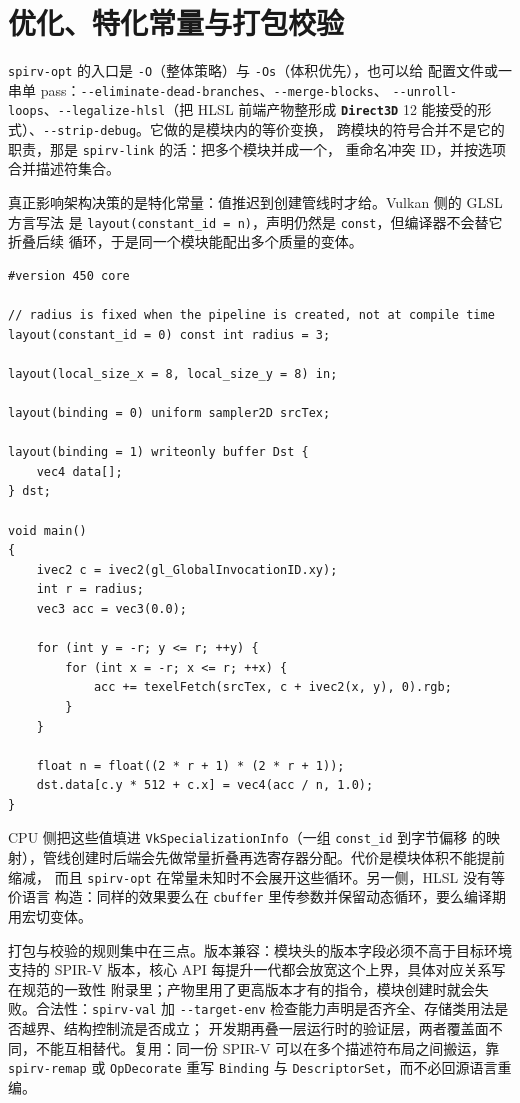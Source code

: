 \documentclass[12pt,a4paper,fontset=fandol]{ctexbook}
\newcommand{\Tp}[1]{\texttt{#1}}
\newcommand{\Opt}[1]{\texttt{-\/-#1}}
\newcommand{\Bk}{\discretionary{}{}{}}
\newcommand{\Lib}[1]{\textbf{\texttt{#1}}}
\newcommand{\Lang}[1]{\textsf{#1}}
\newcommand{\DomCPU}{\Lang{CPU}}
\newcommand{\GSL}{\Lang{GLSL}}
\newcommand{\HSL}{\Lang{HLSL}}
\newcommand{\SPIV}{\Lang{SPIR-V}}
\begin{document}
\section{优化、特化常量与打包校验}

\Tp{spirv\Bk-opt} 的入口是 \Tp{-O}（整体策略）与 \Tp{-Os}（体积优先），也可以给
配置文件或一串单 pass：\Tp{-\/-eliminate-dead-branches}、\Tp{-\/-merge-blocks}、
\Tp{-\/-unroll-loops}、\Tp{-\/-legalize-hlsl}（把 \HSL{} 前端产物整形成
\Lib{Direct3D} 12 能接受的形式）、\Tp{-\/-strip-debug}。它做的是模块内的等价变换，
跨模块的符号合并不是它的职责，那是 \Tp{spirv\Bk-link} 的活：把多个模块并成一个，
重命名冲突 ID，并按选项合并描述符集合。

真正影响架构决策的是特化常量：值推迟到创建管线时才给。Vulkan 侧的 \GSL{} 方言写法
是 \Tp{layout(constant\_id = n)}，声明仍然是 \Tp{const}，但编译器不会替它折叠后续
循环，于是同一个模块能配出多个质量的变体。

\begin{lstlisting}[style=glslstyle,caption={用特化常量控制卷积核半径：编译期保留循环结构，管线创建期定值},label={lst:ch07-spec}]
#version 450 core

// radius is fixed when the pipeline is created, not at compile time
layout(constant_id = 0) const int radius = 3;

layout(local_size_x = 8, local_size_y = 8) in;

layout(binding = 0) uniform sampler2D srcTex;

layout(binding = 1) writeonly buffer Dst {
    vec4 data[];
} dst;

void main()
{
    ivec2 c = ivec2(gl_GlobalInvocationID.xy);
    int r = radius;
    vec3 acc = vec3(0.0);

    for (int y = -r; y <= r; ++y) {
        for (int x = -r; x <= r; ++x) {
            acc += texelFetch(srcTex, c + ivec2(x, y), 0).rgb;
        }
    }

    float n = float((2 * r + 1) * (2 * r + 1));
    dst.data[c.y * 512 + c.x] = vec4(acc / n, 1.0);
}
\end{lstlisting}

\DomCPU{} 侧把这些值填进 \Tp{Vk\Bk SpecializationInfo}（一组 \Tp{const\_id} 到字节偏移
的映射），管线创建时后端会先做常量折叠再选寄存器分配。代价是模块体积不能提前缩减，
而且 \Tp{spirv\Bk-opt} 在常量未知时不会展开这些循环。另一侧，\HSL{} 没有等价语言
构造：同样的效果要么在 \Tp{cbuffer} 里传参数并保留动态循环，要么编译期用宏切变体。

打包与校验的规则集中在三点。版本兼容：模块头的版本字段必须不高于目标环境支持的
\SPIV{} 版本，核心 API 每提升一代都会放宽这个上界，具体对应关系写在规范的一致性
附录里；产物里用了更高版本才有的指令，模块创建时就会失败。合法性：\Tp{spirv\Bk-val}
加 \Opt{target-env} 检查能力声明是否齐全、存储类用法是否越界、结构控制流是否成立；
开发期再叠一层运行时的验证层，两者覆盖面不同，不能互相替代。复用：同一份
\SPIV{} 可以在多个描述符布局之间搬运，靠 \Tp{spirv\Bk-remap} 或
\Tp{Op\Bk Decorate} 重写 \Tp{Binding} 与 \Tp{DescriptorSet}，而不必回源语言重编。
\end{document}
